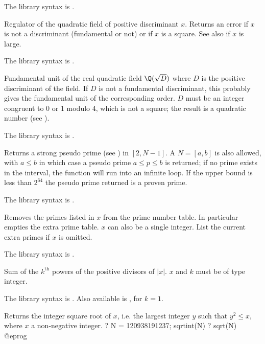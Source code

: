 The library syntax is .

\label{se:quadregulator}
Regulator of the quadratic field of positive discriminant $x$. Returns
an error if $x$ is not a discriminant (fundamental or not) or if $x$ is a
square. See also  if $x$ is large.

The library syntax is .

\label{se:quadunit}
Fundamental unit of the
real quadratic field $\Q(\sqrt D)$ where  $D$ is the positive discriminant
of the field. If $D$ is not a fundamental discriminant, this probably gives
the fundamental unit of the corresponding order. $D$ must be an integer
congruent to 0 or 1 modulo 4, which is not a square; the result is a
quadratic number (see ).

The library syntax is .

\label{se:randomprime}
Returns a strong pseudo prime (see ) in $[2,N-1]$.
A  $N = [a,b]$ is also allowed, with $a \leq b$ in which case a
pseudo prime $a \leq p \leq b$ is returned; if no prime exists in the
interval, the function will run into an infinite loop. If the upper bound
is less than $2^{64}$ the pseudo prime returned is a proven prime.

The library syntax is .

\label{se:removeprimes}
Removes the primes listed in $x$ from
the prime number table. In particular  empties
the extra prime table. $x$ can also be a single integer. List the current
extra primes if $x$ is omitted.

The library syntax is .

\label{se:sigma}
Sum of the $k^{\text{th}}$ powers of the positive divisors of $|x|$. $x$
and $k$ must be of type integer.

The library syntax is .
Also available is , for $k = 1$.

\label{se:sqrtint}
Returns the integer square root of $x$, i.e. the largest integer $y$
such that $y^2 \leq x$, where $x$ a non-negative integer.
\bprog
? N = 120938191237; sqrtint(N)
? sqrt(N)
@eprog

